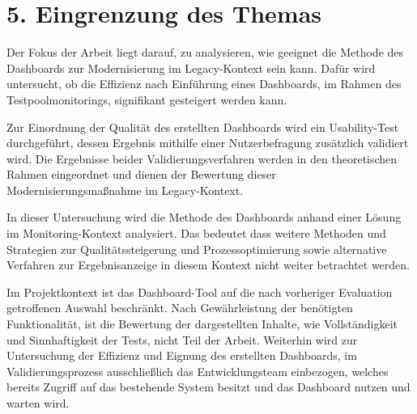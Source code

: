 \section*{5. Eingrenzung des Themas}
Der Fokus der Arbeit liegt darauf, zu analysieren, wie geeignet die Methode des Dashboards zur Modernisierung im Legacy-Kontext sein kann. Dafür wird untersucht, ob die Effizienz nach Einführung eines Dashboards, im Rahmen des Testpoolmonitorings, signifikant gesteigert werden kann.

Zur Einordnung der Qualität des erstellten Dashboards wird ein Usability-Test durchgeführt, dessen Ergebnis mithilfe einer Nutzerbefragung zusätzlich validiert wird. Die Ergebnisse beider Validierungsverfahren werden in den theoretischen Rahmen eingeordnet und dienen der Bewertung dieser Modernisierungsmaßnahme im Legacy-Kontext.

In dieser Untersuchung wird die Methode des Dashboards anhand einer Lösung im Monitoring-Kontext analysiert. Das bedeutet dass weitere Methoden und Strategien zur Qualitätssteigerung und Prozessoptimierung sowie alternative Verfahren zur Ergebnisanzeige in diesem Kontext nicht weiter betrachtet werden.

Im Projektkontext ist das Dashboard-Tool auf die nach vorheriger Evaluation getroffenen Auswahl beschränkt. Nach Gewährleistung der benötigten Funktionalität, ist die Bewertung der dargestellten Inhalte, wie Vollständigkeit und Sinnhaftigkeit der Tests, nicht Teil der Arbeit. Weiterhin wird zur Untersuchung der Effizienz und Eignung des erstellten Dashboards, im Validierungsprozess ausschließlich das Entwicklungsteam einbezogen, welches bereits Zugriff auf das bestehende System besitzt und das Dashboard nutzen und warten wird.
